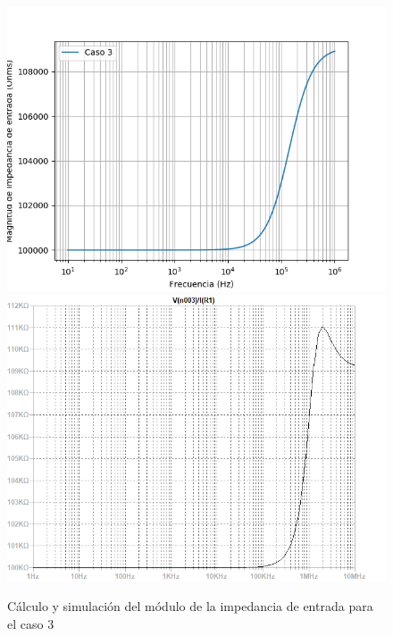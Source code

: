 \begin{figure}[H]
\begin{centering}
\includegraphics[scale=0.5]{../Ex1/iA/Resources1a/zinpm3}\includegraphics[scale=0.4]{../Ex1/iA/Resources1a/zinpm3_sim}
\par\end{centering}
\caption{Cálculo y simulación del módulo de la impedancia de entrada para el
caso 3}
\end{figure}

